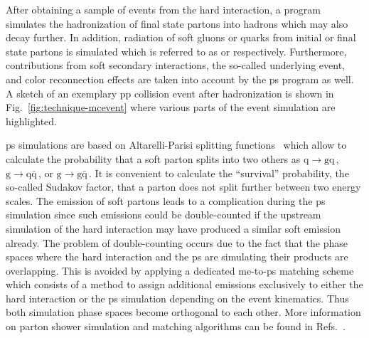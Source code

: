 After obtaining a sample of events from the hard interaction, a  program simulates the hadronization of final state partons into hadrons which may also decay further. In addition, radiation of soft gluons or quarks from initial or final state partons is simulated which is referred to as  or  respectively. Furthermore, contributions from soft secondary interactions, the so-called underlying event, and color reconnection effects are taken into account by the \gls{ps} program as well. A sketch of an exemplary pp collision event after hadronization is shown in Fig.~\ref{fig:technique-mcevent} where various parts of the event simulation are highlighted. 

\Gls{ps} simulations are based on Altarelli-Parisi splitting functions~\cite{Altarelli:1977zs} which allow to calculate the probability that a soft parton splits into two others as $\mathrm{q}\to \mathrm{gq}$\,, $\mathrm{g}\to \mathrm{q}\bar{\mathrm{q}}$\,, or $\mathrm{g}\to \mathrm{g}\bar{\mathrm{q}}$\,. It is convenient to calculate the ``survival'' probability, the so-called Sudakov factor, that a parton does not split further between two energy scales. The emission of soft partons leads to a complication during the \gls{ps} simulation since such emissions could be double-counted if the upstream simulation of the hard interaction may have produced a similar soft emission already.
The problem of double-counting occurs due to the fact that the phase spaces where the hard interaction and the \gls{ps} are simulating their products are overlapping. This is avoided by applying a dedicated \gls{me}-to-\gls{ps} matching scheme which consists of a method to assign additional emissions exclusively to either the hard interaction or the \gls{ps} simulation depending on the event kinematics. Thus both simulation phase spaces become orthogonal to each other. More information on parton shower simulation and matching algorithms can be found in Refs.~\cite{Hoche:2014rga,Alwall:2007fs}.



